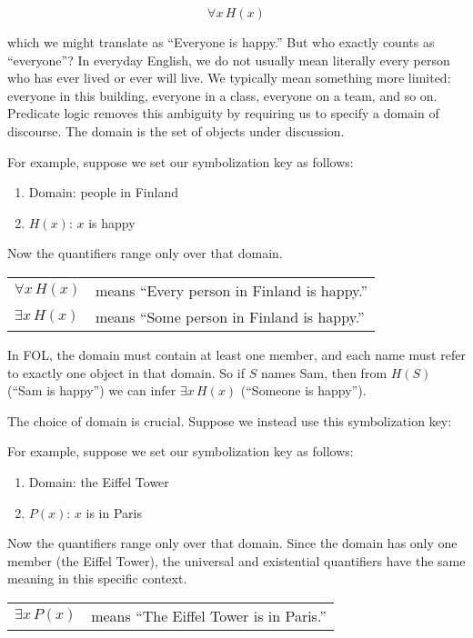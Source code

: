 \documentclass[12pt,a4paper,openany]{article}
\begin{document}
\[\forall x \, H(x)\]

which we might translate as ``Everyone is happy.'' But who exactly
counts as ``everyone''? In everyday English, we do not usually mean
literally every person who has ever lived or ever will live. We
typically mean something more limited: everyone in this building,
everyone in a class, everyone on a team, and so on. Predicate logic
removes this ambiguity by requiring us to specify a domain of discourse.
The domain is the set of objects under discussion.

For example, suppose we set our symbolization key as follows:

\begin{enumerate}
    \item Domain: people in Finland
    \item $H(x)$: $x$ is happy
\end{enumerate}

Now the quantifiers range only over that domain.

\begin{center}
\begin{tabular}{ll}
$\forall x \, H(x)$ & means ``Every person in Finland is happy.'' \\
$\exists x \, H(x)$ & means ``Some person in Finland is happy.''
\end{tabular}
\end{center}

In FOL, the domain must contain at least one member, and each name must
refer to exactly one object in that domain. So if \(S\) names Sam, then
from \(H(S)\) (``Sam is happy'') we can infer \(\exists x \, H(x)\)
(``Someone is happy'').

The choice of domain is crucial. Suppose we instead use this
symbolization key:

For example, suppose we set our symbolization key as follows:

\begin{enumerate}
    \item Domain: the Eiffel Tower
    \item $P(x)$: $x$ is in Paris
\end{enumerate}

Now the quantifiers range only over that domain. Since the domain has only one member (the Eiffel Tower), the universal and existential quantifiers have the same meaning in this specific context.

\begin{center}
\begin{tabular}{ll}
$\exists x \, P(x)$ & means ``The Eiffel Tower is in Paris.''
\end{tabular}
\end{center}
\end{document}
